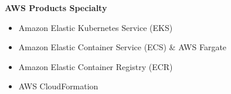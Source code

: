 \textbf{AWS Products Specialty}
    \begin{multicols}{2}
        \begin{itemize}
            \item Amazon Elastic Kubernetes Service (EKS)
            \item Amazon Elastic Container Service (ECS) \& AWS Fargate
            \item Amazon Elastic Container Registry (ECR)
            \item AWS CloudFormation
        \end{itemize}
    \end{multicols}
